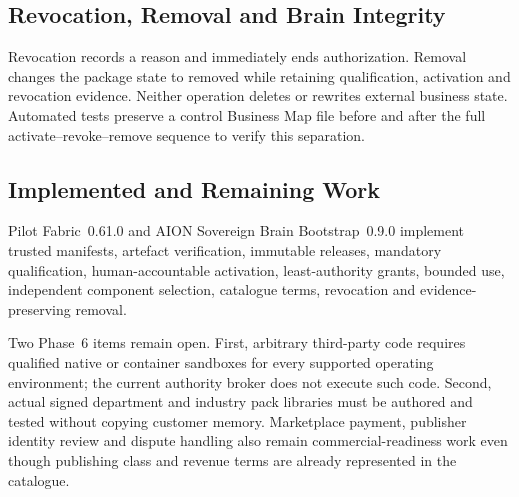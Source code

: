 \subsection{Revocation, Removal and Brain Integrity}

Revocation records a reason and immediately ends authorization.  Removal changes the package
state to removed while retaining qualification, activation and revocation evidence.  Neither
operation deletes or rewrites external business state.  Automated tests preserve a control
Business Map file before and after the full activate--revoke--remove sequence to verify this
separation.

\subsection{Implemented and Remaining Work}

Pilot Fabric~0.61.0 and AION Sovereign Brain Bootstrap~0.9.0 implement trusted manifests,
artefact verification, immutable releases, mandatory qualification, human-accountable
activation, least-authority grants, bounded use, independent component selection, catalogue
terms, revocation and evidence-preserving removal.

Two Phase~6 items remain open.  First, arbitrary third-party code requires qualified native
or container sandboxes for every supported operating environment; the current authority broker
does not execute such code.  Second, actual signed department and industry pack libraries must
be authored and tested without copying customer memory.  Marketplace payment, publisher identity
review and dispute handling also remain commercial-readiness work even though publishing class
and revenue terms are already represented in the catalogue.
